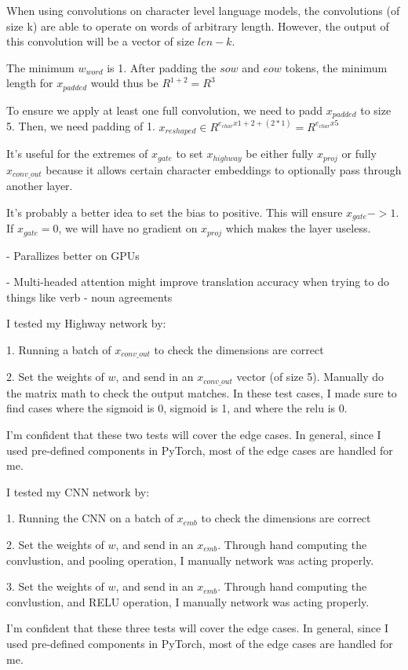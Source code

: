 \documentclass[11pt,largemargins]{homework}
\begin{document}
\maketitle

\question

When using convolutions on character level language models, the convolutions (of size k) are able to operate on words of arbitrary length. However, the output of this convolution will be a vector of size $len - k$. 

\question

The minimum $w_{word}$ is 1. After padding the $sow$ and $eow$ tokens,  the minimum length for $x_{padded}$ would thus be $R^{1+2} = R^{3}$

To ensure we apply at least one full convolution, we need to padd $x_{padded}$ to size 5. Then, we need padding of 1. $x_{reshaped} \in R^{e_{char} x 1 + 2 + (2 * 1)} =  R^{e_{char} x 5}$

\question
It's useful for the extremes of $x_{gate}$ to set $x_{highway}$ be either fully $x_{proj}$ or fully $x_{conv\_out}$ because it allows certain character embeddings to optionally pass through another layer. 

It's probably a better idea to set the bias to positive. This will ensure $x_{gate} -> 1$. If $x_{gate} = 0$, we will have no gradient on $x_{proj}$ which makes the layer useless. 

\question

- Parallizes better on GPUs

- Multi-headed attention might improve translation accuracy when trying to do things like verb - noun agreements 

\question 

I tested my Highway network by:

1. Running a batch of $x_{conv\_out}$ to check the dimensions are correct 

2. Set the weights of $w$, and send in an $x_{conv\_out}$ vector (of size 5). Manually do the matrix math to check the output matches. In these test cases, I made sure to find cases where the sigmoid is 0, sigmoid is 1, and where the relu is 0. 

I'm confident that these two tests will cover the edge cases. In general, since I used pre-defined components in PyTorch, most of the edge cases are handled for me. 

\question 

I tested my CNN network by:

1. Running the CNN on a batch of $x_{emb}$ to check the dimensions are correct 

2. Set the weights of $w$, and send in an $x_{emb}$. Through hand computing the convlustion, and pooling operation, I manually network was acting properly. 

3. Set the weights of $w$, and send in an $x_{emb}$. Through hand computing the convlustion, and RELU operation, I manually network was acting properly. 

I'm confident that these three tests will cover the edge cases. In general, since I used pre-defined components in PyTorch, most of the edge cases are handled for me. 
 
 
\end{document}
